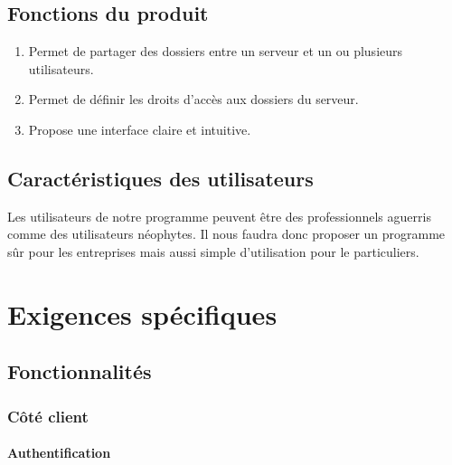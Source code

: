 \documentclass[10pt,a4paper]{report}
\begin{document}
\subsection{Fonctions du produit}
\begin{enumerate}
\item Permet de partager des dossiers entre un serveur et un ou plusieurs utilisateurs.
\item Permet de définir les droits d'accès aux dossiers du serveur.
\item Propose une interface claire et intuitive.
\end{enumerate}

\subsection{Caractéristiques des utilisateurs}
Les utilisateurs de notre programme peuvent être des professionnels aguerris comme des utilisateurs néophytes. Il nous faudra donc proposer un programme sûr pour les entreprises mais aussi simple d'utilisation pour le particuliers.


\section{Exigences spécifiques}

\subsection{Fonctionnalités}

\subsubsection{Côté client}
\paragraph{Authentification}
\end{document}
